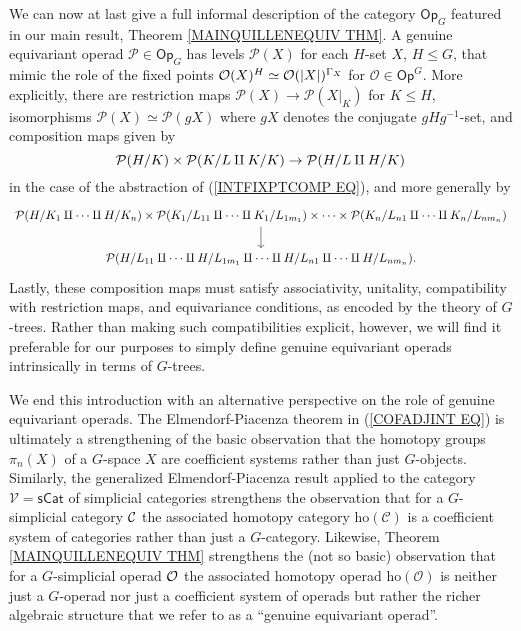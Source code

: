 \documentclass[a4paper,10pt]{article}%
\begin{document}
We can now at last give a full informal description of the category $\mathsf{Op}_G$ featured in 
our main result, Theorem \ref{MAINQUILLENEQUIV THM}.
A genuine equivariant operad
$\mathcal{P} \in \mathsf{Op}_G$
has levels $\mathcal{P}(X)$ for each $H$-set $X$, $H\leq G$, 
that mimic the role of the fixed points $\O(X)^H \simeq \O(|X|)^{\Gamma_X}$ for 
$\mathcal{O} \in \mathsf{Op}^G$.
More explicitly, there are restriction maps 
$\mathcal{P}(X) \to \mathcal{P}(X|_{K})$ for $K \leq H$,
isomorphisms
$\mathcal{P}(X)\simeq \mathcal{P}(g X)$
where $gX$ denotes the conjugate $gHg^{-1}$-set,
and composition maps given by
\[
\P(H/K) \times \P(K/L \amalg K/K) \to \P(H/L \amalg H/K)
\]
in the case of the abstraction of (\ref{INTFIXPTCOMP EQ}), and more generally by
\begin{equation}\label{GENGENMULT EQ}
\begin{tikzcd}
  \mathcal{P}(H/K_1 \amalg \cdots \amalg H/K_n)
  \times
  \mathcal{P}(K_1 / L_{11} \amalg \cdots \amalg K_1/L_{1 m_1})
  \times \cdots \times
  \mathcal{P}(K_n / L_{n1} \amalg \cdots \amalg K_n / L_{n m_n})
  \arrow[d]
  \\
  \mathcal{P}(H / L_{11} \amalg \cdots \amalg H/L_{1 m_1}
  \amalg \cdots \amalg
  H / L_{n1} \amalg \cdots \amalg H/L_{n m_n}
  ).
\end{tikzcd}
\end{equation}
Lastly, these composition maps %
must satisfy associativity, unitality, compatibility with restriction maps, and equivariance conditions, as encoded by the theory of $G$-trees. 
Rather than making such compatibilities explicit, however, we will find it preferable for our purposes to simply define genuine equivariant operads intrinsically in terms of $G$-trees.


We end this introduction with an alternative perspective on the role of genuine equivariant operads.
The Elmendorf-Piacenza theorem in 
(\ref{COFADJINT EQ})
is ultimately a strengthening of the basic observation that the homotopy groups
$\pi_n(X)$ of a $G$-space $X$ are coefficient systems rather than just $G$-objects.
Similarly, the generalized 
Elmendorf-Piacenza result \cite[Thm. 3.17]{Ste16}
applied to the category 
$\mathcal{V}=\mathsf{sCat}$
of simplicial categories strengthens 
the observation that 
for a $G$-simplicial category $\C$
the associated homotopy category
$\text{ho}(\mathcal{C})$
is a coefficient system of categories rather than just a $G$-category.
Likewise, Theorem \ref{MAINQUILLENEQUIV THM}
strengthens the (not so basic) observation that for a $G$-simplicial operad $\O$ the associated homotopy operad 
$\text{ho}(\mathcal{O})$
is neither just a $G$-operad nor 
just a coefficient system of operads
but rather the richer algebraic structure that we refer to as a ``genuine equivariant operad''.
\end{document}
